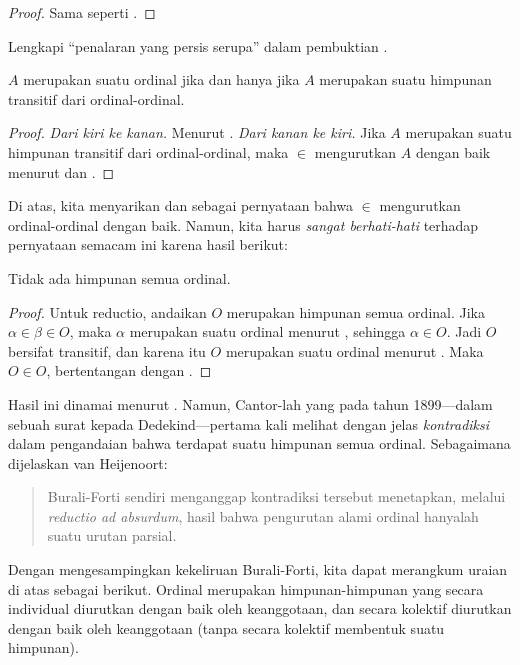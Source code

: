 \documentclass[../../../include/open-logic-section]{subfiles}
\begin{document}
\begin{proof}
Sama seperti .
\end{proof}

\begin{prob}
Lengkapi ``penalaran yang persis serupa'' dalam pembuktian
.
\end{prob}

\begin{cor}
$A$ merupakan suatu ordinal jika dan hanya jika $A$ merupakan suatu himpunan
transitif dari ordinal-ordinal.
\end{cor}

\begin{proof}
\emph{Dari kiri ke kanan.} Menurut .
\emph{Dari kanan ke kiri.} Jika $A$ merupakan suatu himpunan transitif dari
ordinal-ordinal, maka $\in$ mengurutkan $A$ dengan baik menurut
 dan .
\end{proof}

Di atas, kita menyarikan
 dan  sebagai pernyataan bahwa
$\in$ mengurutkan ordinal-ordinal dengan baik. Namun, kita harus
\emph{sangat berhati-hati} terhadap pernyataan semacam ini karena hasil
berikut:

\begin{thm}
Tidak ada himpunan semua ordinal.
\end{thm}

\begin{proof}
Untuk reductio, andaikan $O$ merupakan himpunan semua ordinal. Jika $\alpha
\in \beta \in O$, maka $\alpha$ merupakan suatu ordinal menurut
, sehingga $\alpha \in O$. Jadi $O$ bersifat transitif,
dan karena itu $O$ merupakan suatu ordinal menurut
. Maka $O \in O$, bertentangan dengan
.
\end{proof}
\noindent
Hasil ini dinamai menurut \citeauthor{Burali-Forti1897}. Namun, Cantor-lah
yang pada tahun 1899---dalam sebuah surat kepada Dedekind---pertama kali
melihat dengan jelas \emph{kontradiksi} dalam pengandaian bahwa terdapat
suatu himpunan semua ordinal. Sebagaimana dijelaskan van Heijenoort:
\begin{quote}
  Burali-Forti sendiri menganggap kontradiksi tersebut menetapkan, melalui
  \emph{reductio ad absurdum}, hasil bahwa pengurutan alami ordinal hanyalah
  suatu urutan parsial.
  \citep[p.~105]{Heijenoort1967}
\end{quote}
Dengan mengesampingkan kekeliruan Burali-Forti, kita dapat merangkum uraian
di atas sebagai berikut. Ordinal merupakan himpunan-himpunan yang secara
individual diurutkan dengan baik oleh keanggotaan, dan secara kolektif
diurutkan dengan baik oleh keanggotaan (tanpa secara kolektif membentuk suatu
himpunan).
\end{document}
